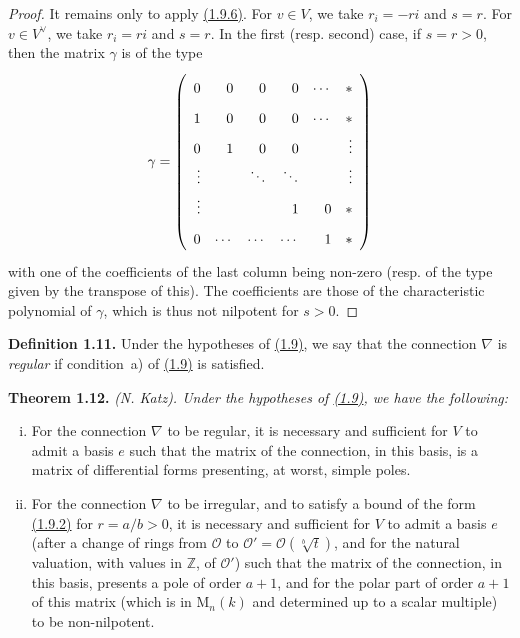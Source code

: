 \documentclass{report}
\newenvironment{itenv}[1]
  {\phantomsection\par\medskip\noindent\textbf{#1.}\itshape}
  {\medskip}
\newenvironment{rmenv}[1]
  {\phantomsection\par\medskip\noindent\textbf{#1.}\rmfamily}
  {\medskip}
\renewcommand{\cal}[1]{{\mathcal{#1}}}
\newcommand{\ZZ}{\mathbb{Z}}
\newcommand{\MM}{\mathrm{M}}
\newcommand{\oldpage}[1]{\marginpar{\footnotesize$\Big\vert$ \textit{p.~#1}}}
\begin{document}
\begin{proof}
  It remains only to apply \hyperref[II.1.9.6]{(1.9.6)}.
  For $v\in V$, we take $r_i=-ri$ and $s=r$.
  For $v\in V^\vee$, we take $r_i=ri$ and $s=r$.
  In the first (resp. second) case, if $s=r>0$, then the matrix $\gamma$ is of the type
  \[
    \gamma =
    \left(
      \def\arraystretch{1.8}
      \begin{array}{rrrrrr}
        0 & 0 & 0 & 0 & \cdots & *
      \\1 & 0 & 0 & 0 & \cdots & *
      \\0 & 1 & 0 & 0 & & \vdots
      \\\vdots & & \ddots & \ddots & & \vdots
      \\\vdots & & & 1 & 0 & *
      \\0 & \cdots & \cdots & \cdots & 1 & *
      \end{array}
    \right)
  \]
  with one of the coefficients of the last column being non-zero (resp. of the type given by the transpose of this).
  The coefficients are those of the characteristic polynomial of $\gamma$, which is thus not nilpotent for $s>0$.
\end{proof}

\begin{rmenv}{Definition 1.11}
\label{II.1.11}
  Under the hypotheses of \hyperref[II.1.9]{(1.9)}, we say that the connection $\nabla$ is \emph{regular} if condition~a) of \hyperref[II.1.9]{(1.9)} is satisfied.
\end{rmenv}

\begin{itenv}{Theorem 1.12}
\label{II.1.12}
  (N. Katz).
  Under the hypotheses of \hyperref[II.1.9]{(1.9)}, we have the following:
  \begin{enumerate}[(i)]
    \item For the connection $\nabla$ to be regular, it is necessary and sufficient for $V$ to admit
\oldpage{51}
      a basis $e$ such that the matrix of the connection, in this basis, is a matrix of differential forms presenting, at worst, simple poles.
    \item For the connection $\nabla$ to be irregular, and to satisfy a bound of the form \hyperref[II.1.9.2]{(1.9.2)} for $r=a/b>0$, it is necessary and sufficient for $V$ to admit a basis $e$ (after a change of rings from $\cal{O}$ to $\cal{O}'=\cal{O}(\sqrt[b]{t})$, and for the natural valuation, with values in $\ZZ$, of $\cal{O}'$) such that the matrix of the connection, in this basis, presents a pole of order $a+1$, and for the polar part of order $a+1$ of this matrix (which is in $\MM_n(k)$ and determined up to a scalar multiple) to be non-nilpotent.
  \end{enumerate}
\end{itenv}
\end{document}
